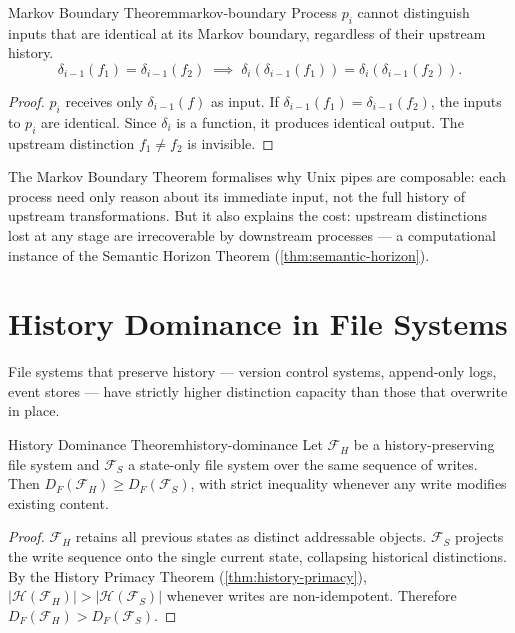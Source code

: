 \documentclass[12pt,twoside,openright]{book}
\newcommand{\csicon} {\marginpar{\tiny\color{DistBlue}\faCode}}
\newcommand{\bioicon}{\marginpar{\tiny\color{DistTeal}\faDna}}
\newcommand{\hist}{\mathcal{H}}
\begin{document}
\begin{theorem}{Markov Boundary Theorem}{markov-boundary}
  Process $p_i$ cannot distinguish inputs that are
  identical at its Markov boundary, regardless of their
  upstream history.
  \[
    \delta_{i-1}(f_1) = \delta_{i-1}(f_2)
    \;\implies\;
    \delta_i(\delta_{i-1}(f_1)) = \delta_i(\delta_{i-1}(f_2)).
  \]
\end{theorem}

\begin{proof}
  $p_i$ receives only $\delta_{i-1}(f)$ as input.
  If $\delta_{i-1}(f_1) = \delta_{i-1}(f_2)$, the inputs
  to $p_i$ are identical. Since $\delta_i$ is a function,
  it produces identical output. The upstream distinction
  $f_1 \ne f_2$ is invisible.
\end{proof}

\noindent
The Markov Boundary Theorem formalises why Unix
pipes are composable: each process need only reason about
its immediate input, not the full history of upstream
transformations. But it also explains the cost: upstream
distinctions lost at any stage are irrecoverable by
downstream processes — a computational instance of the
Semantic Horizon Theorem
(\cref{thm:semantic-horizon}).

\section{History Dominance in File Systems}

\bioicon\csicon
File systems that preserve history — version control
systems, append-only logs, event stores — have strictly
higher distinction capacity than those that overwrite
in place.

\begin{theorem}{History Dominance Theorem}{history-dominance}
  Let $\mathcal{F}_H$ be a history-preserving file system
  and $\mathcal{F}_S$ a state-only file system over the
  same sequence of writes.
  Then $D_F(\mathcal{F}_H) \ge D_F(\mathcal{F}_S)$,
  with strict inequality whenever any write modifies
  existing content.
\end{theorem}

\begin{proof}
  $\mathcal{F}_H$ retains all previous states as distinct
  addressable objects.
  $\mathcal{F}_S$ projects the write sequence onto the
  single current state, collapsing historical distinctions.
  By the History Primacy Theorem
  (\cref{thm:history-primacy}),
  $|\hist(\mathcal{F}_H)| > |\hist(\mathcal{F}_S)|$
  whenever writes are non-idempotent.
  Therefore $D_F(\mathcal{F}_H) > D_F(\mathcal{F}_S)$.
\end{proof}
\end{document}
